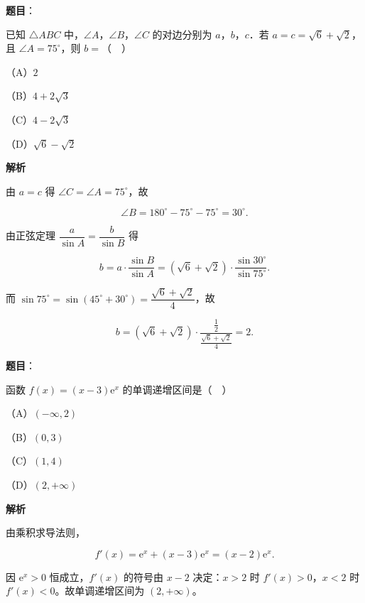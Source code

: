 \begin{answer}

\textbf{题目}：

已知 $\triangle ABC$ 中，$\angle A$，$\angle B$，$\angle C$ 的对边分别为 $a$，$b$，$c$．若 $a=c=\sqrt6+\sqrt2$，且 $\angle A=75^\circ$，则 $b=$（　）

（A）$2$

（B）$4+2\sqrt3$

（C）$4-2\sqrt3$

（D）$\sqrt6-\sqrt2$

\textbf{解析}

由 $a=c$ 得 $\angle C=\angle A=75^\circ$，故

\nopagebreak[4]
\[\angle B=180^\circ-75^\circ-75^\circ=30^\circ.\]

由正弦定理 $\dfrac{a}{\sin A}=\dfrac{b}{\sin B}$ 得

\nopagebreak[4]
\[b=a\cdot\frac{\sin B}{\sin A}=(\sqrt6+\sqrt2)\cdot\frac{\sin30^\circ}{\sin75^\circ}.\]

而 $\sin75^\circ=\sin(45^\circ+30^\circ)=\dfrac{\sqrt6+\sqrt2}{4}$，故

\nopagebreak[4]
\[b=(\sqrt6+\sqrt2)\cdot\frac{\frac12}{\frac{\sqrt6+\sqrt2}{4}}=2.\]


\end{answer}
\begin{answer}

\textbf{题目}：

函数 $f(x)=(x-3)\mathrm e^x$ 的单调递增区间是（　）

（A）$(-\infty,2)$

（B）$(0,3)$

（C）$(1,4)$

（D）$(2,+\infty)$

\textbf{解析}

由乘积求导法则，

\nopagebreak[4]
\[f'(x)=\mathrm e^x+(x-3)\mathrm e^x=(x-2)\mathrm e^x.\]

因 $\mathrm e^x>0$ 恒成立，$f'(x)$ 的符号由 $x-2$ 决定：$x>2$ 时 $f'(x)>0$，$x<2$ 时 $f'(x)<0$。故单调递增区间为 $(2,+\infty)$。


\end{answer}

